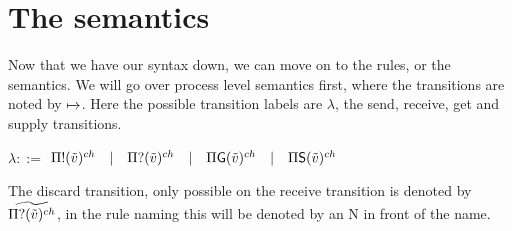 \section{The semantics}
Now that we have our syntax down, we can move on to the rules, or the semantics. We will go over process level semantics first, where the transitions are noted by $\xmapsto[]{}$. Here the possible transition labels are $\lambda$, the send, receive, get and supply transitions.\\
\begin{center}
$\lambda ::=$ $  \Pi ! (\Tilde{v})^{ch}\quad  |\quad \Pi ? (\Tilde{v})^{ch}\quad |\quad \Pi \mathsf{G}(\Tilde{v})^{ch}\quad |\quad \Pi \mathsf{S}(\Tilde{v})^{ch}$
\end{center}
The discard transition, only possible on the receive transition is denoted by $\widetilde{\Pi ? (\Tilde{v})^{ch}}$, in the rule naming this will be denoted by an N in front of the name.

